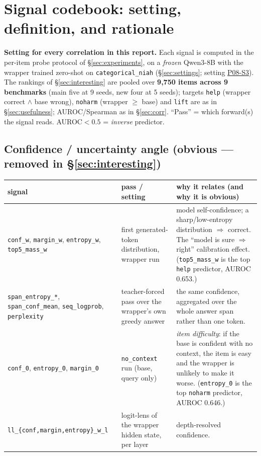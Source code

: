 \documentclass[11pt]{article}
\newcommand{\noctx}{\texttt{no\_context}}
\newcommand{\code}[1]{\texttt{#1}}
\begin{document}
\section{Signal codebook: setting, definition, and rationale}
\label{sec:codebook}
\textbf{Setting for every correlation in this report.} Each signal is
computed in the per-item probe protocol of \S\ref{sec:experiments}, on a
\emph{frozen} Qwen3-8B with the wrapper trained zero-shot on
\code{categorical\_niah} (\S\ref{sec:settings}; setting
\href{https://github.com/BDeMo/research-notes/blob/main/notes/plans/08-model-outputs-delta-w/settings/settings.md#p08-s3--v15-intrinsic-signal-probe}{P08-S3}).
The rankings of
\S\ref{sec:interesting} are pooled over \textbf{9{,}750 items across 9
benchmarks} (main five at 9 seeds, new four at 5 seeds); targets
\code{help} (wrapper correct $\wedge$ base wrong), \code{noharm}
(wrapper $\ge$ base) and \code{lift} are as in \S\ref{sec:usefulness};
AUROC/Spearman as in \S\ref{sec:corr}. ``Pass'' = which forward(s) the
signal reads. AUROC${<}0.5$ = \emph{inverse} predictor.

\subsection{Confidence / uncertainty angle (obvious --- removed in \S\ref{sec:interesting})}
\begin{center}\footnotesize\begin{tabular}{p{3.0cm} p{3.9cm} p{6.0cm}}
\toprule signal & pass / setting & why it relates (and why it is obvious)\\ \midrule
\code{conf\_w}, \code{margin\_w}, \code{entropy\_w}, \code{top5\_mass\_w} & first generated-token distribution, wrapper run & model self-confidence; a sharp/low-entropy distribution $\Rightarrow$ correct. The ``model is sure $\Rightarrow$ right'' calibration effect. (\code{top5\_mass\_w} is the top \code{help} predictor, AUROC 0.653.)\\
\code{span\_entropy\_*}, \code{span\_conf\_mean}, \code{seq\_logprob}, \code{perplexity} & teacher-forced pass over the wrapper's own greedy answer & the same confidence, aggregated over the whole answer span rather than one token.\\
\code{conf\_0}, \code{entropy\_0}, \code{margin\_0} & \noctx{} run (base, query only) & \emph{item difficulty}: if the base is confident with no context, the item is easy and the wrapper is unlikely to make it worse. (\code{entropy\_0} is the top \code{noharm} predictor, AUROC 0.646.)\\
\code{ll\_\{conf,margin,entropy\}\_w\_l} & logit-lens of the wrapper hidden state, per layer & depth-resolved confidence.\\
\bottomrule\end{tabular}\end{center}
\end{document}
